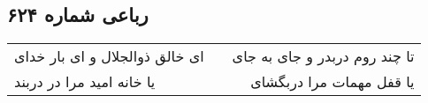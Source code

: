 \begin{center}
\section*{رباعی شماره ۶۲۴}
\label{sec:sh624}
\begin{longtable}{l p{0.5cm} r}
ای خالق ذوالجلال و ای بار خدای
&&
تا چند روم دربدر و جای به جای
\\
یا خانه امید مرا در دربند
&&
یا قفل مهمات مرا دربگشای
\\
\end{longtable}
\end{center}
